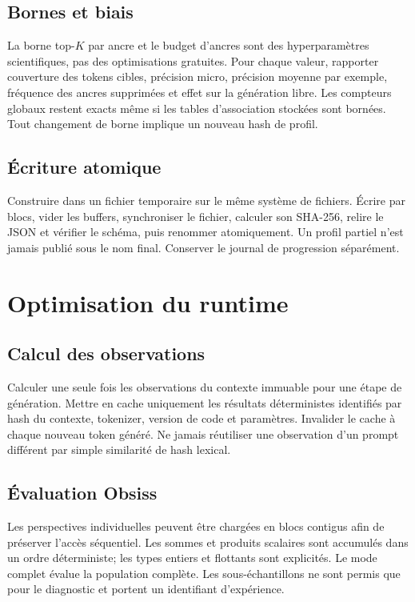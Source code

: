\documentclass[11pt,a4paper]{report}
\begin{document}
\section{Bornes et biais}
La borne top-$K$ par ancre et le budget d'ancres sont des hyperparamètres scientifiques, pas des optimisations gratuites. Pour chaque valeur, rapporter couverture des tokens cibles, précision micro, précision moyenne par exemple, fréquence des ancres supprimées et effet sur la génération libre. Les compteurs globaux restent exacts même si les tables d'association stockées sont bornées. Tout changement de borne implique un nouveau hash de profil.

\section{Écriture atomique}
Construire dans un fichier temporaire sur le même système de fichiers. Écrire par blocs, vider les buffers, synchroniser le fichier, calculer son SHA-256, relire le JSON et vérifier le schéma, puis renommer atomiquement. Un profil partiel n'est jamais publié sous le nom final. Conserver le journal de progression séparément.

\chapter{Optimisation du runtime}
\section{Calcul des observations}
Calculer une seule fois les observations du contexte immuable pour une étape de génération. Mettre en cache uniquement les résultats déterministes identifiés par hash du contexte, tokenizer, version de code et paramètres. Invalider le cache à chaque nouveau token généré. Ne jamais réutiliser une observation d'un prompt différent par simple similarité de hash lexical.

\section{Évaluation Obsiss}
Les perspectives individuelles peuvent être chargées en blocs contigus afin de préserver l'accès séquentiel. Les sommes et produits scalaires sont accumulés dans un ordre déterministe; les types entiers et flottants sont explicités. Le mode complet évalue la population complète. Les sous-échantillons ne sont permis que pour le diagnostic et portent un identifiant d'expérience.
\end{document}
